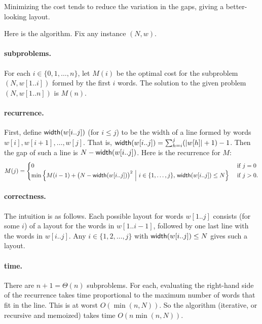 Minimizing the cost tends to reduce the variation
in the gaps, giving a better-looking layout.

Here is the algorithm.  Fix any instance $(N, w)$.

\paragraph{subproblems.}
  For each $i\in\{0,1,\ldots, n\}$,
  let $M(i)$ be the optimal cost for the subproblem $(N, w[1..i])$
  formed by the first $i$ words.
  The solution to the given problem $(N, w[1..n])$ is $M(n)$.

\paragraph{recurrence.}
  First, define $\operatorname{\sf width}(w[i..j])$ (for $i\le j$)
  to be the width of a line formed by words $w[i], w[i+1], \ldots, w[j]$.
  That is, $\operatorname{\sf width}(w[i..j]) = \sum_{h=i}^j (|w[h]| + 1) - 1$.
  Then the gap of such a line is $N - \operatorname{\sf width}(w[i..j])$.
  Here is the recurrence for $M$:
  \[
    M(j) = \begin{cases}
      0 & \text{ if } j=0 \\
    \min \Big\{ M(i-1) + \big(N-\operatorname{\sf width}( w[i..j])\big) ^2
    ~\Big|~  i\in\{1,\ldots,j\},\,\operatorname{\sf width}( w[i..j] ) \le N\Big \}
    & \text{ if } j > 0.
  \end{cases}
\]

\paragraph{correctness.}  The intuition is as follows.
Each possible layout for words $w[1..j]$
consists (for some $i$) of a layout for the words in $w[1..i-1]$,
followed by one last line with the words in $w[i..j]$.
Any $i\in\{1,2,\ldots,j\}$ with $\operatorname{\sf width}( w[i..j] )\le N$
gives such a layout.

\paragraph{time.}
There are $n+1 = \Theta(n)$ subproblems.
For each, evaluating the right-hand side of the recurrence takes
time proportional to the maximum number of words that fit in the line.
This is at worst $O(\min(n, N))$.
So the algorithm (iterative, or recursive and memoized)
takes time $O(n\min(n, N))$.

